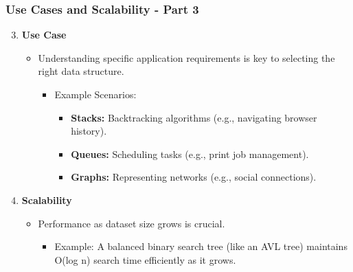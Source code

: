 \documentclass{beamer}
\begin{document}
\begin{frame}[fragile]
    \frametitle{Use Cases and Scalability - Part 3}
    \begin{enumerate}
        \setcounter{enumi}{2}
        \item \textbf{Use Case}
            \begin{itemize}
                \item Understanding specific application requirements is key to selecting the right data structure.
                \begin{itemize}
                    \item Example Scenarios:
                    \begin{itemize}
                        \item \textbf{Stacks:} Backtracking algorithms (e.g., navigating browser history).
                        \item \textbf{Queues:} Scheduling tasks (e.g., print job management).
                        \item \textbf{Graphs:} Representing networks (e.g., social connections).
                    \end{itemize}
                \end{itemize}
            \end{itemize}
        \item \textbf{Scalability}
            \begin{itemize}
                \item Performance as dataset size grows is crucial. 
                \begin{itemize}
                    \item Example: A balanced binary search tree (like an AVL tree) maintains O(log n) search time efficiently as it grows.
                \end{itemize}
            \end{itemize}
    \end{enumerate}
\end{frame}
\end{document}
